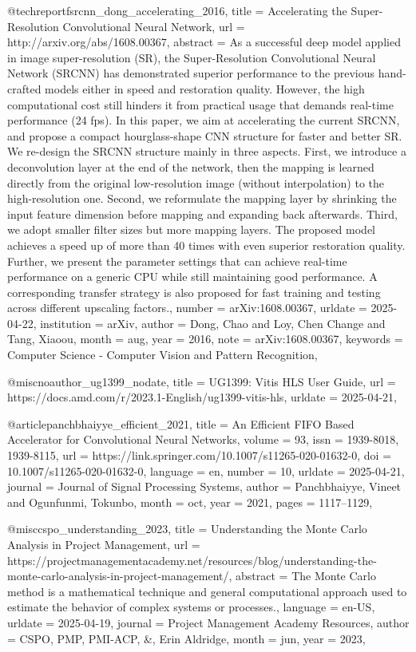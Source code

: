 {@techreport{fsrcnn_dong_accelerating_2016,
	title = {Accelerating the {Super}-{Resolution} {Convolutional} {Neural} {Network}},
	url = {http://arxiv.org/abs/1608.00367},
	abstract = {As a successful deep model applied in image super-resolution (SR), the Super-Resolution Convolutional Neural Network (SRCNN) has demonstrated superior performance to the previous hand-crafted models either in speed and restoration quality. However, the high computational cost still hinders it from practical usage that demands real-time performance (24 fps). In this paper, we aim at accelerating the current SRCNN, and propose a compact hourglass-shape CNN structure for faster and better SR. We re-design the SRCNN structure mainly in three aspects. First, we introduce a deconvolution layer at the end of the network, then the mapping is learned directly from the original low-resolution image (without interpolation) to the high-resolution one. Second, we reformulate the mapping layer by shrinking the input feature dimension before mapping and expanding back afterwards. Third, we adopt smaller filter sizes but more mapping layers. The proposed model achieves a speed up of more than 40 times with even superior restoration quality. Further, we present the parameter settings that can achieve real-time performance on a generic CPU while still maintaining good performance. A corresponding transfer strategy is also proposed for fast training and testing across different upscaling factors.},
	number = {arXiv:1608.00367},
	urldate = {2025-04-22},
	institution = {arXiv},
	author = {Dong, Chao and Loy, Chen Change and Tang, Xiaoou},
	month = aug,
	year = {2016},
	note = {arXiv:1608.00367},
	keywords = {Computer Science - Computer Vision and Pattern Recognition},
}

@misc{noauthor_ug1399_nodate,
	title = {{UG1399}: {Vitis} {HLS} {User} {Guide}},
	url = {https://docs.amd.com/r/2023.1-English/ug1399-vitis-hls},
	urldate = {2025-04-21},
}

@article{panchbhaiyye_efficient_2021,
	title = {An {Efficient} {FIFO} {Based} {Accelerator} for {Convolutional} {Neural} {Networks}},
	volume = {93},
	issn = {1939-8018, 1939-8115},
	url = {https://link.springer.com/10.1007/s11265-020-01632-0},
	doi = {10.1007/s11265-020-01632-0},
	language = {en},
	number = {10},
	urldate = {2025-04-21},
	journal = {Journal of Signal Processing Systems},
	author = {Panchbhaiyye, Vineet and Ogunfunmi, Tokunbo},
	month = oct,
	year = {2021},
	pages = {1117--1129},
}

@misc{cspo_understanding_2023,
	title = {Understanding the {Monte} {Carlo} {Analysis} in {Project} {Management}},
	url = {https://projectmanagementacademy.net/resources/blog/understanding-the-monte-carlo-analysis-in-project-management/},
	abstract = {The Monte Carlo method is a mathematical technique and general computational approach used to estimate the behavior of complex systems or processes.},
	language = {en-US},
	urldate = {2025-04-19},
	journal = {Project Management Academy Resources},
	author = {CSPO, PMP, PMI-ACP, \&, Erin Aldridge},
	month = jun,
	year = {2023},
}

}
